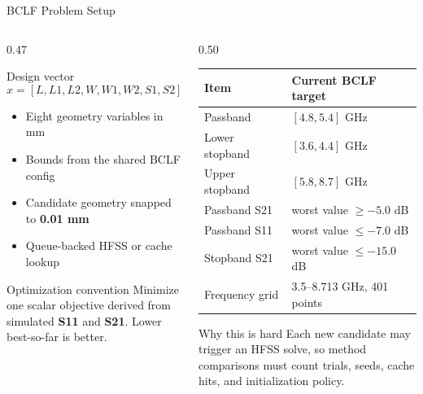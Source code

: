 \documentclass[aspectratio=169,10pt]{beamer}
\newcommand{\metric}[1]{\textbf{\textcolor{primary}{#1}}}
\begin{document}
\begin{frame}{BCLF Problem Setup}
  \footnotesize
  \begin{columns}[T,onlytextwidth]
    \begin{column}{0.47\textwidth}
      \begin{block}{Design vector}
        \[
          x = [L,L1,L2,W,W1,W2,S1,S2]
        \]
        \vspace{-0.25cm}
        \begin{itemize}
          \item Eight geometry variables in mm
          \item Bounds from the shared BCLF config
          \item Candidate geometry snapped to \metric{0.01 mm}
          \item Queue-backed HFSS or cache lookup
        \end{itemize}
      \end{block}
      \vspace{0.15cm}
      \begin{block}{Optimization convention}
        Minimize one scalar objective derived from simulated \metric{S11} and
        \metric{S21}. Lower best-so-far is better.
      \end{block}
    \end{column}
    \begin{column}{0.50\textwidth}
      \scriptsize
      \begin{tabularx}{\linewidth}{@{}lX@{}}
        \toprule
        Item & Current BCLF target \\
        \midrule
        Passband & $[4.8, 5.4]$ GHz \\
        Lower stopband & $[3.6, 4.4]$ GHz \\
        Upper stopband & $[5.8, 8.7]$ GHz \\
        Passband S21 & worst value $\ge -5.0$ dB \\
        Passband S11 & worst value $\le -7.0$ dB \\
        Stopband S21 & worst value $\le -15.0$ dB \\
        Frequency grid & 3.5--8.713 GHz, 401 points \\
        \bottomrule
      \end{tabularx}
      \vspace{0.25cm}
      \begin{block}{Why this is hard}
        Each new candidate may trigger an HFSS solve, so method comparisons
        must count trials, seeds, cache hits, and initialization policy.
      \end{block}
    \end{column}
  \end{columns}
\end{frame}
\end{document}
